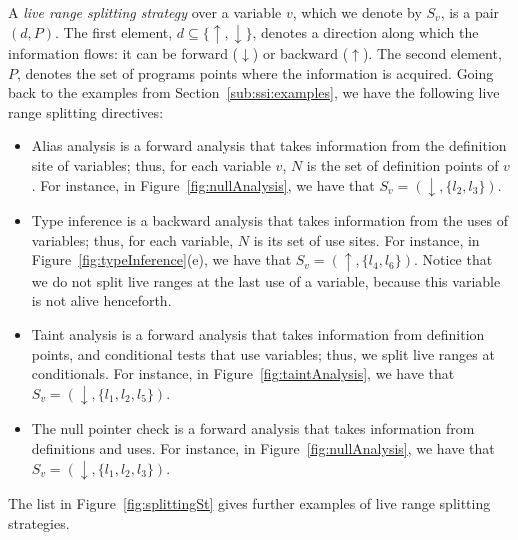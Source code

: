 A {\em live range splitting strategy} over a variable $v$, which we denote by
$S_v$, is a pair $(d, P)$.
The first element, $d \subseteq \{\uparrow, \downarrow\}$, denotes a direction
along which the information flows: it can be forward ($\downarrow$) or backward
($\uparrow$).
The second element, $P$, denotes the set of programs points where
the information is acquired.
Going back to the examples from Section~\ref{sub:ssi:examples}, we have the
following live range splitting directives:
\begin{itemize}
\item Alias analysis is a forward analysis that takes information from the
definition site of variables; thus, for each variable $v$, $N$ is the set of
definition points of $v$.
For instance, in Figure~\ref{fig:nullAnalysis}, we have that
$S_{v} = (\downarrow, \{l_2, l_3\})$.

\item Type inference is a backward analysis that takes information from the
uses of variables; thus, for each variable, $N$ is its set of use sites.
For instance, in Figure~\ref{fig:typeInference}(e), we have that
$S_{v} = (\uparrow, \{l_4, l_6\})$.
Notice that we do not split live ranges at the last use of a variable, because
this variable is not alive henceforth.

\item Taint analysis is a forward analysis that takes information from
definition points, and conditional tests that use variables; thus, we split
live ranges at conditionals.
For instance, in Figure~\ref{fig:taintAnalysis}, we have that
$S_{v} = (\downarrow, \{l_1, l_2, l_5\})$.

\item The null pointer check is a forward
analysis that takes information from definitions and uses.
For instance, in Figure~\ref{fig:nullAnalysis}, we have that
$S_{v} = (\downarrow, \{l_1, l_2, l_3\})$.
\end{itemize}
The list in Figure~\ref{fig:splittingSt} gives further examples of live
range splitting strategies.

